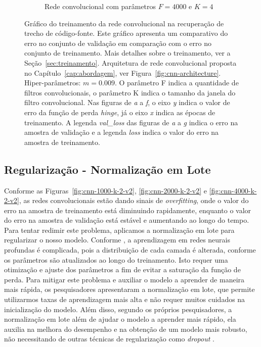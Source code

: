 \begin{figure}[H]
\begin{subfigure}{.5\textwidth}
  \caption{Rede convolucional com parâmetros $F = 4000$ e $K = 4$}
  \label{fig:cnn-4000-k-4}
\end{subfigure}
\caption{Gráfico do treinamento da rede convolucional na recuperação de trecho de código-fonte. Este gráfico apresenta um comparativo do erro no conjunto de validação em comparação com o erro no conjunto de treinamento. Mais detalhes sobre o treinamento, ver a Seção~\ref{sec:treinamento}. Arquitetura de rede convolucional proposta no Capítulo~\ref{cap:abordagem}, ver Figura~\ref{fig:cnn-architecture}. Hiper-parâmetros: $m = 0.009$. O parâmetro F indica a quantidade de filtros convolucionais, o parâmetro K indica o tamanho da janela do filtro convolucional. Nas figuras de \emph{a} a \emph{f}, o eixo \emph{y} indica o valor de erro da função de perda \textit{hinge}, já o eixo \emph{x} indica as épocas de treinamento. A legenda \emph{val\_loss} das figuras de \emph{a} a \emph{g} indica o erro na amostra de validação e a legenda \emph{loss} indica o valor do erro na amostra de treinamento. }
\label{fig:treinamento-cnn-diferentes-kernels-2}
\end{figure}

\subsection{Regularização - Normalização em Lote}
\label{sec:regularizacao-normalizacao-lote}

Conforme as Figuras~\ref{fig:cnn-1000-k-2-v2}, \ref{fig:cnn-2000-k-2-v2} e \ref{fig:cnn-4000-k-2-v2}, as redes convolucionais estão dando sinais de \textit{overfitting}, onde o valor do erro na amostra de treinamento está diminuindo rapidamente, enquanto o valor do erro na amostra de validação está estável e aumentando ao longo do tempo. Para tentar redimir este problema, aplicamos a normalização em lote para regularizar o nosso modelo. Conforme \cite{sergey-batch-normalization-2015}, a aprendizagem em redes neurais profundas é complicada, pois a distribuição de cada camada é alterada, conforme os parâmetros são atualizados ao longo do treinamento. Isto requer uma otimização e ajuste dos parâmetros a fim de evitar a saturação da função de perda. Para mitigar este problema e auxiliar o modelo a aprender de maneira mais rápida, os pesquisadores apresentaram a normalização em lote, que permite utilizarmos taxas de aprendizagem mais alta e não requer muitos cuidados na inicialização do modelo. Além disso, segundo os próprios pesquisadores, a normalização em lote além de ajudar o modelo a aprender mais rápido, ela auxilia na melhora do desempenho e na obtenção de um modelo mais robusto, não necessitando de outras técnicas de regularização como \textit{dropout} \citep{sergey-batch-normalization-2015}.

